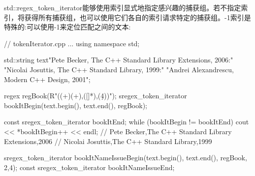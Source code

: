 std::regex\_token\_iterator能够使用索引显式地指定感兴趣的捕获组。若不指定索引，将获得所有捕获组，也可以使用它们各自的索引请求特定的捕获组。-1索引是特殊的:可以使用-1来定位匹配之间的文本:


\begin{cpp}
// tokenIterator.cpp
...
using namespace std;

std::string text{"Pete Becker, The C++ Standard Library Extensions, 2006:"
				 "Nicolai Josuttis, The C++ Standard Library, 1999:"
				 "Andrei Alexandrescu, Modern C++ Design, 2001"};
	
regex regBook(R"((\w+)\s(\w+),([\w\s\+]*),(\d{4}))");
sregex_token_iterator bookItBegin(text.begin(), text.end(), regBook);

const sregex_token_iterator bookItEnd;
while (bookItBegin != bookItEnd){
	cout << *bookItBegin++ << endl;
} // Pete Becker,The C++ Standard Library Extensions,2006
  // Nicolai Josuttis,The C++ Standard Library,1999

sregex_token_iterator bookItNameIssueBegin(text.begin(), text.end(),
										   regBook, {{2,4}});
const sregex_token_iterator bookItNameIssueEnd;
\end{cpp}










